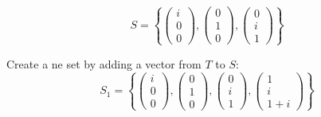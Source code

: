 \documentclass{article}
\begin{document}
\[
   S = \left\{
      \begin{pmatrix}
         i \\
         0 \\
         0
      \end{pmatrix},
      \begin{pmatrix}
         0 \\
         1 \\
         0
      \end{pmatrix},
      \begin{pmatrix}
         0 \\
         i \\
         1
      \end{pmatrix}
   \right\}
\]

Create a ne set by adding a vector from \(T\) to \(S\):
\[
   S_1 = \left\{
      \begin{pmatrix}
         i \\
         0 \\
         0
      \end{pmatrix},
      \begin{pmatrix}
         0 \\
         1 \\
         0
      \end{pmatrix},
      \begin{pmatrix}
         0 \\
         i \\
         1
      \end{pmatrix},
      \begin{pmatrix}
         1 \\
         i \\
         1 + i
      \end{pmatrix}
   \right\}
\]
\end{document}
